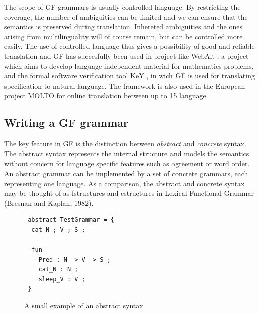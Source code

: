 \documentclass{report}
\begin{document}
\newpage %
The scope of GF grammars is usually controlled language. By
restricting the coverage, the number of ambiguities
can be limited and we can ensure that the semantics is preserved during
translation. Inhereted ambiguities and the ones arising from multilinguality will
of course remain, but can be controlled more easily. %
The use of controlled language thus gives a possibility of good and reliable translation
and GF has succesfully been used in project like %
WebAlt \cite{webalt}, a project which aims to develop language independent
material for mathematics problems, and the formal software verification tool
KeY \cite{key}, in wich GF is used for translating specification to natural language.
The framework is also used in the
European project MOLTO \cite{Molto} for online translation between up to 15 language.\\


\subsection{Writing a GF grammar}
The key feature in GF is the distinction between
\textit{abstract} and \textit{concrete} syntax. The abstract syntax represents
the internal structure and models the semantics without concern for language
specific features such as agreement or word order.
An abstract grammar can be implemented by a set of concrete grammars, each
representing one language. As a comparison, the abstract and concrete syntax
may be thought of as fstructures and cstructures in Lexical Functional Grammar (Bresnan and Kaplan, 1982).

\begin{figure}[h]
\begin{verbatim}
 abstract TestGrammar = {
  cat N ; V ; S ;

  fun 
    Pred : N -> V -> S ;
    cat_N : N ;
    sleep_V : V ;
 }
\end{verbatim}
\caption{A small example of an abstract syntax}
\label{fig:gfAbstract1}
\end{figure}
\end{document}
